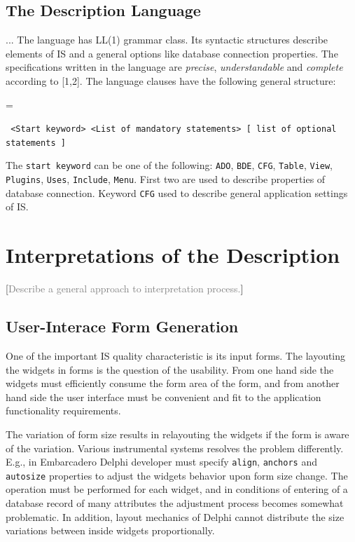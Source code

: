 \documentclass[conference]{IEEEtran}
\newcommand{\e}[2][fcolor]{\textcolor{pcolor}{[}\textcolor{#1}{#2}\textcolor{pcolor}{]}}
\newenvironment{asdcode}{\hangindent=\parindent\hangafter=1\par\noindent\tt}{}
\begin{document}
\subsection{The Description Language}

... The language has LL(1) grammar class.  Its syntactic structures describe elements of IS and a general options like database connection properties.  The specifications written in the language are \emph{precise}, \emph{understandable} and \emph{complete} according to [1,2].  The language clauses have the following general structure:

\begin{asdcode}%
<Start keyword> <List of mandatory statements> [~list of optional statements~]
\end{asdcode}

The \texttt{start keyword} can be one of the following: \texttt{ADO}, \texttt{BDE}, \texttt{CFG}, \texttt{Table}, \texttt{View}, \texttt{Plugins}, \texttt{Uses}, \texttt{Include}, \texttt{Menu}.  First two are used to describe properties of database connection.  Keyword \texttt{CFG} used to describe general application settings of IS.



\section{Interpretations of the Description}
\label{sec:interpr-descr}

\e[gray]{Describe a general approach to interpretation process.}

\subsection{User-Interace Form Generation}
\label{sec:user-interace-form}
One of the important IS quality characteristic is its input forms.  The layouting the widgets in forms is the question of the usability.  From one hand side the widgets must efficiently consume the form area of the form, and from another hand side the user interface must be convenient and fit to the application functionality requirements.

The variation of form size results in relayouting the widgets if the form is aware of the variation.  Various instrumental systems resolves the problem differently.  E.g., in Embarcadero Delphi developer must specify \texttt{align}, \texttt{anchors} and \texttt{autosize} properties to adjust the widgets behavior upon form size change.  The operation must be performed for each widget, and in conditions of entering of a database record of many attributes the adjustment process becomes somewhat problematic.  In addition, layout mechanics of Delphi cannot distribute the size variations between inside widgets proportionally.
\end{document}
